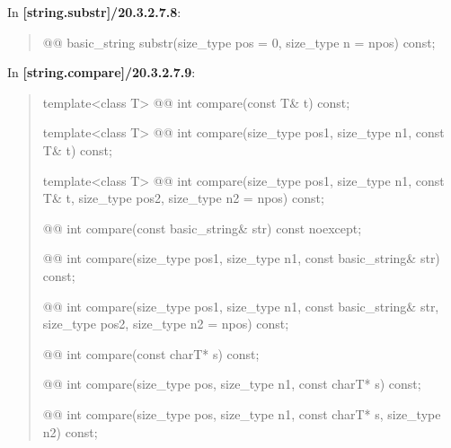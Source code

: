 \documentclass{wg21}
\begin{document}
In \textbf{[string.substr]/20.3.2.7.8}:
\begin{quote}
\begin{itemdecl}
@@ basic_string substr(size_type pos = 0, size_type n = npos) const;
\end{itemdecl}
\end{quote}

In \textbf{[string.compare]/20.3.2.7.9}:
\begin{quote}
\begin{itemdecl}
template<class T>
  @@
  int compare(const T& t) const;
\end{itemdecl}

\begin{itemdecl}
template<class T>
  @@
  int compare(size_type pos1, size_type n1, const T& t) const;
\end{itemdecl}

\begin{itemdecl}
template<class T>
  @@
  int compare(size_type pos1, size_type n1, const T& t, size_type pos2, size_type n2 = npos) const;
\end{itemdecl}

\begin{itemdecl}
@@
int compare(const basic_string& str) const noexcept;
\end{itemdecl}

\begin{itemdecl}
@@
int compare(size_type pos1, size_type n1, const basic_string& str) const;
\end{itemdecl}

\begin{itemdecl}
@@
int compare(size_type pos1, size_type n1, const basic_string& str,
            size_type pos2, size_type n2 = npos) const;
\end{itemdecl}

\begin{itemdecl}
@@
int compare(const charT* s) const;
\end{itemdecl}

\begin{itemdecl}
@@
int compare(size_type pos, size_type n1, const charT* s) const;
\end{itemdecl}

\begin{itemdecl}
@@
int compare(size_type pos, size_type n1, const charT* s, size_type n2) const;
\end{itemdecl}
\end{quote}
\end{document}
